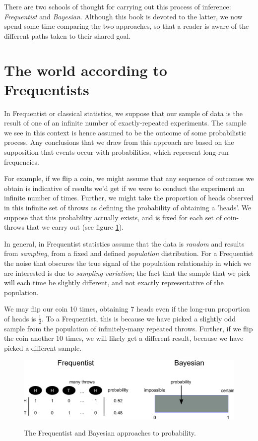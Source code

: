 \documentclass[11pt,fullpage]{book}
\begin{document}
There are two schools of thought for carrying out this process of inference: \textit{Frequentist} and \textit{Bayesian}. Although this book is devoted to the latter, we now spend some time comparing the two approaches, so that a reader is aware of the different paths taken to their shared goal.

\section{The world according to Frequentists}\label{sec:Intro_FrequentistsWorld}
In Frequentist or classical statistics, we suppose that our sample of data is the result of one of an infinite number of exactly-repeated experiments. The sample we see in this context is hence assumed to be the outcome of some probabilistic process. Any conclusions that we draw from this approach are based on the supposition that events occur with probabilities, which represent long-run frequencies. 

For example, if we flip a coin, we might assume that any sequence of outcomes we obtain is indicative of results we'd get if we were to conduct the experiment an infinite number of times. Further, we might take the proportion of heads observed in this infinite set of throws as defining the probability of obtaining a 'heads'. We suppose that this probability actually exists, and is fixed for each set of coin-throws that we carry out (see figure \ref{fig:Intro_FrequentistBayesProbability}).

In general, in Frequentist statistics assume that the data is \textit{random} and results from \textit{sampling}, from a fixed and defined \textit{population} distribution. For a Frequentist the noise that obscures the true signal of the population relationship in which we are interested is due to \textit{sampling variation}; the fact that the sample that we pick will each time be slightly different, and not exactly representative of the population. 

We may flip our coin 10 times, obtaining 7 heads even if the long-run proportion of heads is $\frac{1}{2}$. To a Frequentist, this is because we have picked a slightly odd sample from the population of infinitely-many repeated throws. Further, if we flip the coin another 10 times, we will likely get a different result, because we have picked a different sample.

\begin{figure}
\centering
\scalebox{0.3} 
{\includegraphics{Intro_FrequentistBayesProbability.pdf}}
\caption{The Frequentist and Bayesian approaches to probability.}\label{fig:Intro_FrequentistBayesProbability}
\end{figure}
\end{document}

